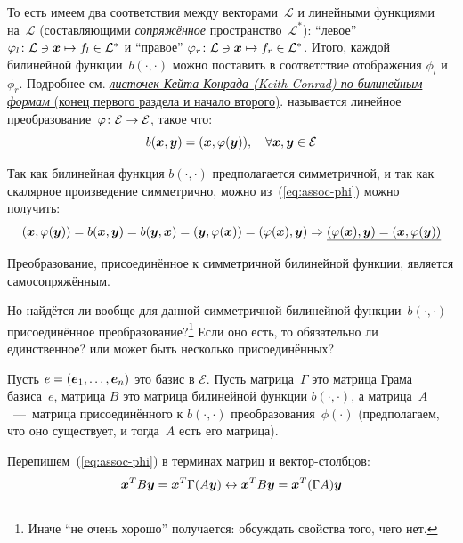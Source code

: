 \documentclass[a4paper,12pt]{article}
\theoremstyle{remark}
\begin{document}
\begin{definition}
{      То есть имеем два соответствия между векторами~$\mathcal L$ и линейными функциями на~$\mathcal L$ (составляющими \emph{сопряжённое} пространство~$\mathcal L^*$): ``левое'' $\phi_l\colon \mathcal L \hm\ni \bds x \hm\mapsto f_{l} \hm\in \mathcal L^*$ и ``правое'' $\phi_r\colon \mathcal L \hm\ni \bds x \hm\mapsto f_{r} \hm\in \mathcal L^*$.
      Итого, каждой билинейной функции~$b(\cdot, \cdot)$ можно поставить в соответствие отображения $\phi_l$ и $\phi_r$.
      Подробнее см. \href{https://kconrad.math.uconn.edu/blurbs/linmultialg/bilinearform.pdf}{\emph{листочек Кейта Конрада (Keith Conrad) по билинейным формам} (конец первого раздела и начало второго)}.
    } называется линейное преобразование~$\phi\colon \mathcal E \hm\to \mathcal E$, такое что:
    \begin{equation}\label{eq:assoc-phi}
      b(\boldsymbol x, \boldsymbol y) = (\boldsymbol x, \varphi(\boldsymbol y)),\quad \forall \boldsymbol x, \boldsymbol y \in \mathcal E
    \end{equation}
  \end{definition}
  
  Так как билинейная функция $b(\cdot, \cdot)$ предполагается симметричной, и так как скалярное произведение симметрично, можно из~(\ref{eq:assoc-phi}) можно получить:
  \[
    (\boldsymbol x, \varphi(\boldsymbol y)) = b(\boldsymbol x, \boldsymbol y) = b(\boldsymbol y, \boldsymbol x) = (\boldsymbol y, \varphi(\boldsymbol x)) = (\varphi(\boldsymbol x), \boldsymbol y)
    \Rightarrow \underline{(\varphi(\boldsymbol x), \boldsymbol y) = (\boldsymbol x, \varphi(\boldsymbol y))}
  \]

  \begin{proposition}\label{theo:assoc-is-self-adjo}
    Преобразование, присоединённое к симметричной билинейной функции, является самосопряжённым.
  \end{proposition}

  Но найдётся ли вообще для данной симметричной билинейной функции~$b(\cdot, \cdot)$ присоединённое преобразование?\footnote{Иначе ``не очень хорошо'' получается: обсуждать свойства того, чего нет.}
  Если оно есть, то обязательно ли единственное? или может быть несколько присоединённых?

  Пусть $e \hm= (\bds e_1, \ldots, \bds e_n)$ это базис в $\mathcal E$.
  Пусть матрица~$\Gamma$ это матрица Грама базиса~$e$, матрица $B$ это матрица билинейной функции $b(\cdot, \cdot)$, а матрица~$A$~---~матрица присоединённого к $b(\cdot, \cdot)$ преобразования~$\phi(\cdot)$ (предполагаем, что оно существует, и тогда~$A$ есть его матрица).

  Перепишем~(\ref{eq:assoc-phi}) в терминах матриц и вектор-столбцов:
  \[
    \boldsymbol x^T B \boldsymbol y = \boldsymbol x^T \Gamma (A \boldsymbol y)
    \leftrightarrow \boldsymbol x^T B \boldsymbol y = \boldsymbol x^T (\Gamma A) \boldsymbol y
  \]
\end{document}
